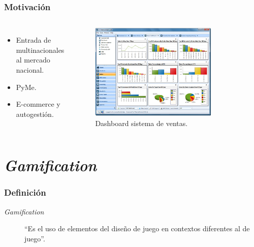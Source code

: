 \documentclass[10pt, compress]{beamer}
\begin{document}
\begin{frame}[fragile]
  \frametitle{Motivación}
\begin{columns}[onlytextwidth]
\begin{itemize}
\item Entrada de multinacionales \\
al mercado nacional.
\item PyMe. 
\item E-commerce y autogestión.
\end{itemize}

\begin{figure}
\centering
    \includegraphics[width=0.8\textwidth]{images/SalesDashboard.jpg}
    \caption{Dashboard sistema de ventas.}
    \label{fig:awesome_image}
\end{figure}
\end{columns}
\end{frame}

\section{\emph{Gamification}}

\begin{frame}[fragile]
  \frametitle{Definición}
  \begin{description}
    \item[\emph{Gamification}] ``Es el uso de elementos del diseño de juego en contextos diferentes al de 
juego''.
  \end{description}

\end{frame}
\end{document}
